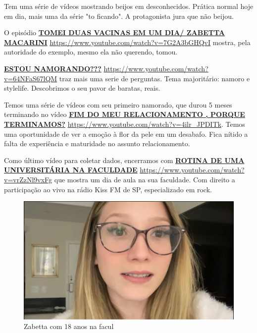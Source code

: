 Tem uma série de vídeos mostrando beijos em desconhecidos. Prática normal hoje em dia, mais uma da série "to ficando". A protagonista jura que não beijou.

O episódio \href{https://www.youtube.com/watch?v=7G2A3bGHQvI}{\textbf{TOMEI DUAS VACINAS EM UM DIA/ ZABETTA MACARINI}} \url{https://www.youtube.com/watch?v=7G2A3bGHQvI} mostra, pela autoridade do exemplo, mesmo ela não querendo, tomou.

\href{https://www.youtube.com/watch?v=64NFaS67lQM}{\textbf{ESTOU NAMORANDO???}} \url{https://www.youtube.com/watch?v=64NFaS67lQM} traz mais uma serie de perguntas. Tema majoritário: namoro e stylelife. Descobrimos o seu pavor de baratas, reais.

Temos uma série de vídeos com seu primeiro namorado, que durou 5 meses terminando no vídeo \href{https://www.youtube.com/watch?v=4ilr_JPDITk}{\textbf{FIM DO MEU RELACIONAMENTO , PORQUE TERMINAMOS?}} \url{https://www.youtube.com/watch?v=4ilr_JPDITk}. Temos uma oportunidade de ver a emoção à flor da pele em um desabafo.
Fica nítido a falta de experiência e maturidade no assunto relacionamento.

Como último vídeo para coletar dados, encerramos com \href{https://www.youtube.com/watch?v=vrZzNl9vxFg}{\textbf{ROTINA DE UMA UNIVERSITÁRIA NA FACULDADE}} \url{https://www.youtube.com/watch?v=vrZzNl9vxFg} que mostra um dia de aula na sua faculdade. Com direito a participação ao vivo na rádio Kiss FM de SP, especializado em rock.

\begin{figure}[h!]
    \centering
    \includegraphics[width=0.7\linewidth]{fig/Zabetta-18-anos-facul}
    \caption{Zabetta com 18 anos na facul}
    \label{fig:zabetta-18-anos-facul}
\end{figure}

